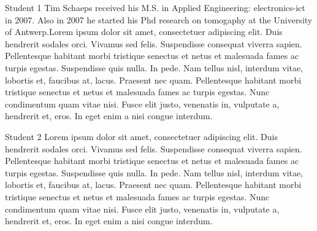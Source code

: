 \documentclass[9pt,journal,compsoc,twoside, a4paper]{elab}
\begin{document}
\begin{IEEEbiography}{Student 1}
Tim Schaeps received his M.S. in Applied Engineering: electronics-ict in 2007. Also in  2007 he started his Phd research on tomogaphy at the University of Antwerp.Lorem ipsum dolor sit amet, consectetuer adipiscing elit. Duis hendrerit sodales orci. Vivamus sed felis. Suspendisse consequat viverra sapien. Pellentesque habitant morbi tristique senectus et netus et malesuada fames ac turpis egestas. Suspendisse quis nulla. In pede. Nam tellus nisl, interdum vitae, lobortis et, faucibus at, lacus. Praesent nec quam. Pellentesque habitant morbi tristique senectus et netus et malesuada fames ac turpis egestas. Nunc condimentum quam vitae nisi. Fusce elit justo, venenatis in, vulputate a, hendrerit et, eros. In eget enim a nisi congue interdum. 
\end{IEEEbiography}
\begin{IEEEbiography}{Student 2}
Lorem ipsum dolor sit amet, consectetuer adipiscing elit. Duis hendrerit sodales orci. Vivamus sed felis. Suspendisse consequat viverra sapien. Pellentesque habitant morbi tristique senectus et netus et malesuada fames ac turpis egestas. Suspendisse quis nulla. In pede. Nam tellus nisl, interdum vitae, lobortis et, faucibus at, lacus. Praesent nec quam. Pellentesque habitant morbi tristique senectus et netus et malesuada fames ac turpis egestas. Nunc condimentum quam vitae nisi. Fusce elit justo, venenatis in, vulputate a, hendrerit et, eros. In eget enim a nisi congue interdum. 
\end{IEEEbiography}

\vfill

\end{document}
